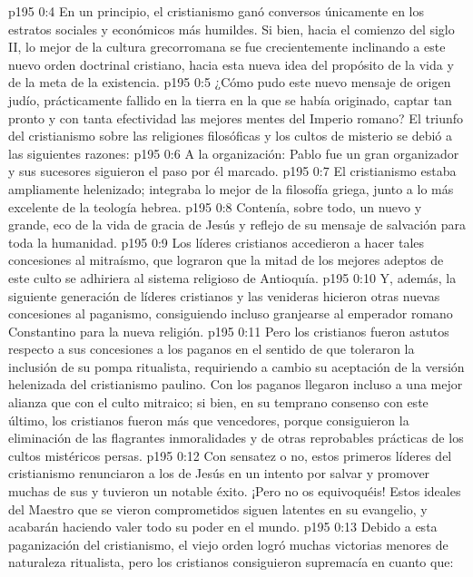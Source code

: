 \vs p195 0:4 \pc En un principio, el cristianismo ganó conversos únicamente en los estratos sociales y económicos más humildes. Si bien, hacia el comienzo del siglo II, lo mejor de la cultura grecorromana se fue crecientemente inclinando a este nuevo orden doctrinal cristiano, hacia esta nueva idea del propósito de la vida y de la meta de la existencia.
\vs p195 0:5 ¿Cómo pudo este nuevo mensaje de origen judío, prácticamente fallido en la tierra en la que se había originado, captar tan pronto y con tanta efectividad las mejores mentes del Imperio romano? El triunfo del cristianismo sobre las religiones filosóficas y los cultos de misterio se debió a las siguientes razones:
\vs p195 0:6 A la organización: Pablo fue un gran organizador y sus sucesores siguieron el paso por él marcado.
\vs p195 0:7 El cristianismo estaba ampliamente helenizado; integraba lo mejor de la filosofía griega, junto a lo más excelente de la teología hebrea.
\vs p195 0:8 Contenía, sobre todo, un  nuevo y grande, eco de la vida de gracia de Jesús y reflejo de su mensaje de salvación para toda la humanidad.
\vs p195 0:9 Los líderes cristianos accedieron a hacer tales concesiones al mitraísmo, que lograron que la mitad de los mejores adeptos de este culto se adhiriera al sistema religioso de Antioquía.
\vs p195 0:10 Y, además, la siguiente generación de líderes cristianos y las venideras hicieron otras nuevas concesiones al paganismo, consiguiendo incluso granjearse al emperador romano Constantino para la nueva religión.
\vs p195 0:11 \pc Pero los cristianos fueron astutos respecto a sus concesiones a los paganos en el sentido de que toleraron la inclusión de su pompa ritualista, requiriendo a cambio su aceptación de la versión helenizada del cristianismo paulino. Con los paganos llegaron incluso a una mejor alianza que con el culto mitraico; si bien, en su temprano consenso con este último, los cristianos fueron más que vencedores, porque consiguieron la eliminación de las flagrantes inmoralidades y de otras reprobables prácticas de los cultos mistéricos persas.
\vs p195 0:12 Con sensatez o no, estos primeros líderes del cristianismo renunciaron a los  de Jesús en un intento por salvar y promover muchas de sus  y tuvieron un notable éxito. ¡Pero no os equivoquéis! Estos ideales del Maestro que se vieron comprometidos siguen latentes en su evangelio, y acabarán haciendo valer todo su poder en el mundo.
\vs p195 0:13 Debido a esta paganización del cristianismo, el viejo orden logró muchas victorias menores de naturaleza ritualista, pero los cristianos consiguieron supremacía en cuanto que:
